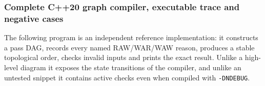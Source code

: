 \subsubsection{Complete C++20 graph compiler, executable trace and negative cases}\label{06-engine-ii-ch042-complete-c20-graph-compiler-executable-trace-and-negative-cases}

\hypertarget{06-engine-ii-ch042-complete-c20-graph-compiler-executable-trace-and-negative-cases}{}

The following program is an independent reference implementation: it constructs a pass DAG, records every named RAW/WAR/WAW reason, produces a stable topological order, checks invalid inputs and prints the exact result. Unlike a high-level diagram it exposes the state transitions of the compiler, and unlike an untested snippet it contains active checks even when compiled with \texttt{-DNDEBUG}.

